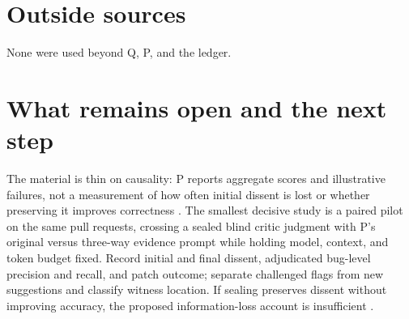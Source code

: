 \documentclass{article}
\begin{document}
\section*{Outside sources}

None were used beyond Q, P, and the ledger.

\section*{What remains open and the next step}

The material is thin on causality: P reports aggregate scores and illustrative failures, not a measurement of how often initial dissent is lost or whether preserving it improves correctness . The smallest decisive study is a paired pilot on the same pull requests, crossing a sealed blind critic judgment with P's original versus three-way evidence prompt while holding model, context, and token budget fixed. Record initial and final dissent, adjudicated bug-level precision and recall, and patch outcome; separate challenged flags from new suggestions and classify witness location. If sealing preserves dissent without improving accuracy, the proposed information-loss account is insufficient .
\end{document}
